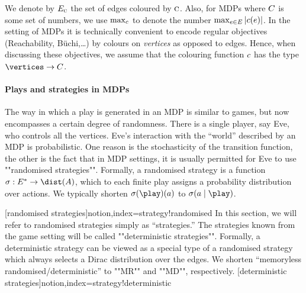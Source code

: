 We denote by $E_{\textsc{c}}$ the set of edges coloured by $\textsc{c}$. Also, for MDPs where $C$ is some set of numbers, we use $\max_{c}$ to denote the number $\max_{e\in 
	E}|c(e)|$.
In the setting of MDPs it is technically convenient to encode regular objectives (Reachability, B{\"u}chi,\dots) by colours on \emph{vertices} as opposed to edges. Hence, when discussing these objectives, we assume that the colouring function $c$ has the type $\vertices \rightarrow \colours$.



\paragraph{Plays and strategies in MDPs}


 The way in which a play is generated in an MDP is similar to games, but now encompasses a certain degree of randomness. There is a single player, say Eve, who controls all the vertices. Eve's interaction with the ``world'' described by an MDP is probabilistic. One reason is the stochasticity of the transition function, the other is the fact that in MDP settings, it is usually permitted for Eve to use ""randomised strategies"". Formally, a randomised strategy is a function $\sigma : E^* \to \dist(A)$, which to each finite play assigns a probability distribution over actions. 
 We typically shorten $\sigma(\play)(a)$ to $\sigma(a\mid \play)$.
 
 [randomised strategies]{notion,index={strategy!randomised}}
%
In this section, we will refer to randomised strategies simply as ``strategies.'' The strategies known from the game setting will be called  ""deterministic strategies"". Formally, a deterministic strategy can be viewed as a special type of a randomised strategy which always selects a Dirac distribution over the edges. We shorten ``memoryless randomised/deterministic'' to ""MR"" and ""MD"", respectively.
[deterministic strategies]{notion,index={strategy!deterministic}}

